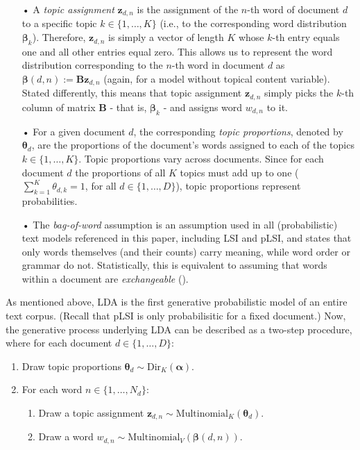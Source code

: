 \begin{itemize}
\vspace{-0.25cm}
\item[•] A \textit{topic assignment} $\boldsymbol{z}_{d,n}$ is the assignment of the $n$-th word of document $d$ to a specific topic $k \in \{1,\dots,K\}$ (i.e., to the corresponding word distribution $\boldsymbol{\beta}_k$). Therefore, $\boldsymbol{z}_{d,n}$ is simply a vector of length $K$ whose $k$-th entry equals one and all other entries equal zero. This allows us to represent the word distribution corresponding to the $n$-th word in document $d$ as $\boldsymbol{\beta}(d,n):=\boldsymbol{B}\boldsymbol{z}_{d,n}$ (again, for a model without topical content variable). Stated differently, this means that topic assignment $\boldsymbol{z}_{d,n}$ simply picks the $k$-th column of matrix $\boldsymbol{B}$ - that is, $\boldsymbol{\beta}_k$ - and assigns word $w_{d,n}$ to it. 
\vspace{-0.25cm}
\item[•] For a given document $d$, the corresponding \textit{topic proportions}, denoted by $\boldsymbol{\theta}_d$, are the proportions of the document's words assigned to each of the topics $k \in \{1,\dots,K\}$. Topic proportions vary across documents. Since for each document $d$ the proportions of all $K$ topics must add up to one ($\sum_{k=1}^{K}\theta_{d,k}=1$, for all $d \in \{1,\dots,D\}$), topic proportions represent probabilities.
\vspace{-0.25cm}
\item[•] The \textit{bag-of-word} assumption is an assumption used in all (probabilistic) text models referenced in this paper, including LSI and pLSI, and states that only words themselves (and their counts) carry meaning, while word order or grammar do not. Statistically, this is equivalent to assuming that words within a document are \textit{exchangeable} (\citealp{aldous1985exchangeability}).

\end{itemize}

\noindent
As mentioned above, LDA is the first generative probabilistic model of an entire text corpus. (Recall that pLSI is only probabilisitic for a fixed document.) 
Now, the generative process underlying LDA can be described as a two-step procedure, where for each document $d \in \{1,\dots,D\}$:

\begin{enumerate}[{1)}]
\item Draw topic proportions $\boldsymbol{\theta}_d \sim \text{Dir}_K(\boldsymbol{\alpha})$.
\item For each word $n \in \{1,\dots,N_d\}$:
	\begin{enumerate}[{a)}]  
    \item Draw a topic assignment $\boldsymbol{z}_{d,n} \sim \text{Multinomial}_K(\boldsymbol{\theta}_d)$.
    \item Draw a word $w_{d,n} \sim \text{Multinomial}_V(\boldsymbol{\beta}(d,n))$.
	\end{enumerate}
\end{enumerate}

